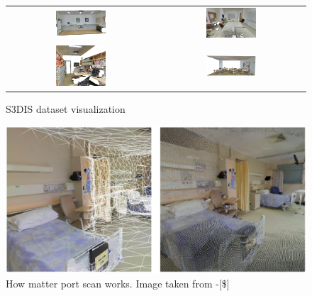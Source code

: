 \begin{figure}[!ht]
\begin{tabular}{cc}
        \includegraphics[width=0.35\textwidth, height=0.15\textheight]{images/seg_output/s3dis_DE/S3DIS_3_RGB.pdf} &
        \includegraphics[width=0.35\textwidth, height=0.15\textheight]{images/seg_output/s3dis_DE/S3DIS_7_RGB.pdf} \\

        \includegraphics[width=0.35\textwidth, height=0.15\textheight]{images/seg_output/s3dis_DE/S3DIS_4_RGB.pdf} &
        \includegraphics[width=0.35\textwidth, height=0.15\textheight]{images/seg_output/s3dis_DE/S3DIS_8_RGB.pdf} \\
    \end{tabular}
    \caption{S3DIS dataset visualization}
    \label{fig:s3dis_get_vis}
\end{figure}

\begin{figure}
    \centering
    \includegraphics[scale=0.35]{images/seg_output/s3dis_DE/matterport_scan.pdf}
    \caption{How matter port scan works. Image taken from \cite{}-[\$]}
    \label{fig:how_matterport_works}
\end{figure}
